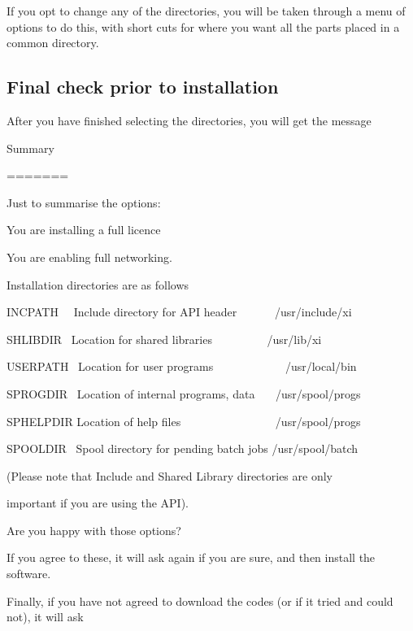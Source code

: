 {If you opt to change any of the directories, you will be taken through a
menu of options to do this, with short cuts for where you want all the
parts placed in a common directory.

\subsection{Final check prior to installation}
After you have finished selecting the directories, you will get the
message

\begin{expara}

Summary

=======

\bigskip

Just to summarise the options:

\bigskip

You are installing a full licence

You are enabling full networking.

\bigskip

Installation directories are as follows

\bigskip

INCPATH \ \ Include directory for API header
\ \ \ \ \ \ /usr/include/xi

SHLIBDIR \ Location for shared libraries \ \ \ \ \ \ \ \ \ /usr/lib/xi

USERPATH \ Location for user programs
\ \ \ \ \ \ \ \ \ \ \ \ /usr/local/bin

SPROGDIR \ Location of internal programs, data \ \ \ /usr/spool/progs

SPHELPDIR Location of help files
\ \ \ \ \ \ \ \ \ \ \ \ \ \ \ \ /usr/spool/progs

SPOOLDIR \ Spool directory for pending batch jobs /usr/spool/batch

\bigskip

(Please note that Include and Shared Library directories are only

important if you are using the API).

\bigskip

Are you happy with those options?

\end{expara}

If you agree to these, it will ask again if you are sure, and then
install the software.

Finally, if you have not agreed to download the codes (or if it tried
and could not), it will ask

}
